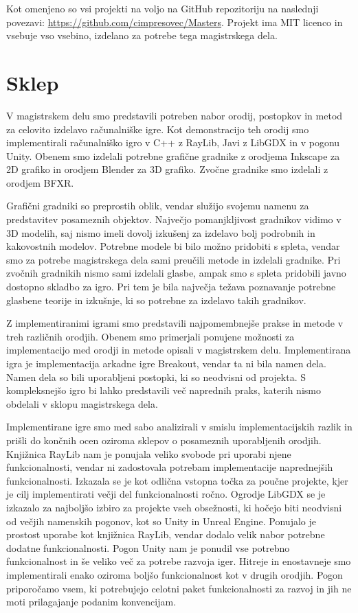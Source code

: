 \documentclass[12pt,a4paper,twoside]{book}
\begin{document}
Kot omenjeno so vsi projekti na voljo na GitHub repozitoriju na naslednji povezavi: \url{https://github.com/cimpresovec/Masters}. Projekt ima MIT licenco in vsebuje vso vsebino, izdelano za potrebe tega magistrskega dela.

\chapter{Sklep}\thispagestyle{fancy}
V magistrskem delu smo predstavili potreben nabor orodij, postopkov in metod za celovito izdelavo računalniške igre. Kot demonstracijo teh orodij smo implementirali računalniško igro v C++ z RayLib, Javi z LibGDX in v pogonu Unity. Obenem smo izdelali potrebne grafične gradnike z orodjema Inkscape za 2D grafiko in orodjem Blender za 3D grafiko. Zvočne gradnike smo izdelali z orodjem BFXR.

Grafični gradniki so preprostih oblik, vendar služijo svojemu namenu za predstavitev posameznih objektov. Največjo pomanjkljivost gradnikov vidimo v 3D modelih, saj nismo imeli dovolj izkušenj za izdelavo bolj podrobnih in kakovostnih modelov. Potrebne modele bi bilo možno pridobiti s spleta, vendar smo za potrebe magistrskega dela sami preučili metode in izdelali gradnike. Pri zvočnih gradnikih nismo sami izdelali glasbe, ampak smo s spleta pridobili javno dostopno skladbo za igro. Pri tem je bila največja težava poznavanje potrebne glasbene teorije in izkušnje, ki so potrebne za izdelavo takih gradnikov.

Z implementiranimi igrami smo predstavili najpomembnejše prakse in metode v treh različnih orodjih. Obenem smo primerjali ponujene možnosti za implementacijo med orodji in metode opisali v magistrskem delu. Implementirana igra je implementacija arkadne igre Breakout, vendar ta ni bila namen dela. Namen dela so bili uporabljeni postopki, ki so neodvisni od projekta. S kompleksnejšo igro bi lahko predstavili več naprednih praks, katerih nismo obdelali v sklopu magistrskega dela.

Implementirane igre smo med sabo analizirali v smislu implementacijskih razlik in prišli do končnih ocen oziroma sklepov o posameznih uporabljenih orodjih. Knjižnica RayLib nam je ponujala veliko svobode pri uporabi njene funkcionalnosti, vendar ni zadostovala potrebam implementacije naprednejših funkcionalnosti. Izkazala se je kot odlična vstopna točka za poučne projekte, kjer je cilj implementirati večji del funkcionalnosti ročno. Ogrodje LibGDX se je izkazalo za najboljšo izbiro za projekte vseh obsežnosti, ki hočejo biti neodvisni od večjih namenskih pogonov, kot so Unity in Unreal Engine. Ponujalo je prostost uporabe kot knjižnica RayLib, vendar dodalo velik nabor potrebne dodatne funkcionalnosti. Pogon Unity nam je ponudil vse potrebno funkcionalnost in še veliko več za potrebe razvoja iger. Hitreje in enostavneje smo implementirali enako oziroma boljšo funkcionalnost kot v drugih orodjih. Pogon priporočamo vsem, ki potrebujejo celotni paket funkcionalnosti za razvoj in jih ne moti prilagajanje podanim konvencijam.
\end{document}

